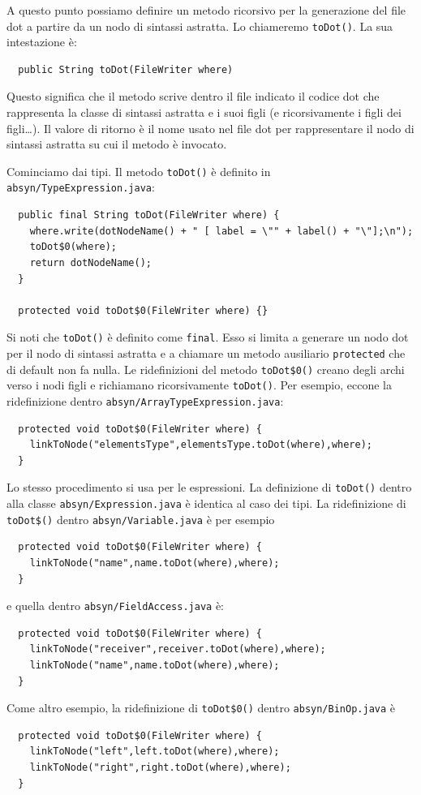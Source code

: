 A questo punto possiamo definire un metodo ricorsivo per la generazione del
file dot a partire da un nodo di sintassi astratta. Lo chiameremo
\texttt{toDot()}. La sua intestazione \`e:
%
\begin{verbatim}
  public String toDot(FileWriter where)
\end{verbatim}
%
Questo significa che il metodo scrive dentro il file indicato il codice
dot che rappresenta la classe di sintassi astratta e i suoi figli (e
ricorsivamente i figli dei figli\ldots). Il valore
di ritorno \`e il nome usato nel file dot per rappresentare il nodo
di sintassi astratta su cui il metodo \`e invocato.

Cominciamo dai tipi. Il metodo \texttt{toDot()} \`e \cosi definito in
\texttt{absyn/TypeExpression.java}:
%
\begin{verbatim}
  public final String toDot(FileWriter where) {
    where.write(dotNodeName() + " [ label = \"" + label() + "\"];\n");
    toDot$0(where);
    return dotNodeName();
  }

  protected void toDot$0(FileWriter where) {}
\end{verbatim}
%
Si noti che \texttt{toDot()}
\`e definito come \texttt{final}. Esso si limita a generare
un nodo dot per il nodo di sintassi astratta e a chiamare un metodo ausiliario
\texttt{protected} che di default non fa nulla. Le ridefinizioni del
metodo \texttt{toDot\$0()} creano degli archi
verso i nodi figli e richiamano ricorsivamente \texttt{toDot()}.
Per esempio, eccone la ridefinizione dentro
\texttt{absyn/ArrayTypeExpression.java}:
%
\begin{verbatim}
  protected void toDot$0(FileWriter where) {
    linkToNode("elementsType",elementsType.toDot(where),where);
  }
\end{verbatim}

Lo stesso procedimento si usa per le espressioni.
La definizione di \texttt{toDot()} dentro alla classe
\texttt{absyn/Expression.java} \`e
identica al caso dei tipi. La ridefinizione di \texttt{toDot\$()} dentro
\texttt{absyn/Variable.java} \`e per esempio
%
\begin{verbatim}
  protected void toDot$0(FileWriter where) {
    linkToNode("name",name.toDot(where),where);
  }
\end{verbatim}
e quella dentro \texttt{absyn/FieldAccess.java} \`e:
%
\begin{verbatim}
  protected void toDot$0(FileWriter where) {
    linkToNode("receiver",receiver.toDot(where),where);
    linkToNode("name",name.toDot(where),where);
  }
\end{verbatim}
Come altro esempio, la ridefinizione di \texttt{toDot\$0()} dentro
\texttt{absyn/BinOp.java} \`e
%
\begin{verbatim}
  protected void toDot$0(FileWriter where) {
    linkToNode("left",left.toDot(where),where);
    linkToNode("right",right.toDot(where),where);
  }
\end{verbatim}


